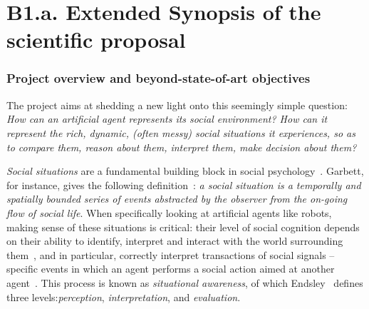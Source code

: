 
\newrefsection


\chapter{B1.a. Extended Synopsis of the scientific proposal}\label{part1}




\subsection{Project overview and beyond-state-of-art objectives}

The \project project aims at shedding a new light onto this seemingly simple
question: \emph{How can an artificial agent represents its social environment?
How can it represent the rich, dynamic, (often messy) social situations it
experiences, so as to compare them, reason about them, interpret them, make
decision about them?}

\emph{Social situations} are a fundamental building block in social
psychology~\cite{argyle1981social}. Garbett, for instance, gives the following
definition~\cite{garbett1970analysis}: \emph{a social situation is a temporally
and spatially bounded series of events abstracted by the observer from the
on-going flow of social life}. When specifically looking at artificial agents
like robots, making sense of these situations is critical: their level of social
cognition depends on their ability to identify, interpret and interact with the
world surrounding them~\cite{szczepanowski2017computational}, and in particular,
correctly interpret transactions of social signals -- specific events in which
an agent performs a social action aimed at another
agent~\cite{pantic2011social}. This process is known as \textit{situational
awareness}, of which Endsley~\cite{endsley1995theory} defines three
levels:\emph{perception}, \emph{interpretation}, and \emph{evaluation}.

